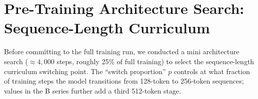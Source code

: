 \documentclass[11pt]{article}
\begin{document}
\section{Pre-Training Architecture Search: Sequence-Length Curriculum}
\label{app:arch-search}

Before committing to the full training run, we conducted a
mini architecture search (${\approx}4{,}000$ steps, roughly
25\% of full training) to select the sequence-length curriculum
switching point.
The ``switch proportion'' $p$ controls at what fraction of
training steps the model transitions from 128-token to 256-token
sequences; values in the B series further add a third 512-token stage.

\begin{table}[h]
\centering
\small
\setlength{\tabcolsep}{4pt}
\caption{Mini architecture search at 4{,}000 steps (25\% of full training).
A series: DeBERTa relative position encodings, varying the 128$\to$256
sequence-length transition point.
B series: RoPE position encodings with a three-stage curriculum.
All scores are partial; final models trained to 16{,}372 steps
score ${\approx}$4--5 points higher on BLiMP.
Rdg\,=\,(ET\,+\,SPR)/2.}
\label{tab:arch-search}
\end{table}
\end{document}
